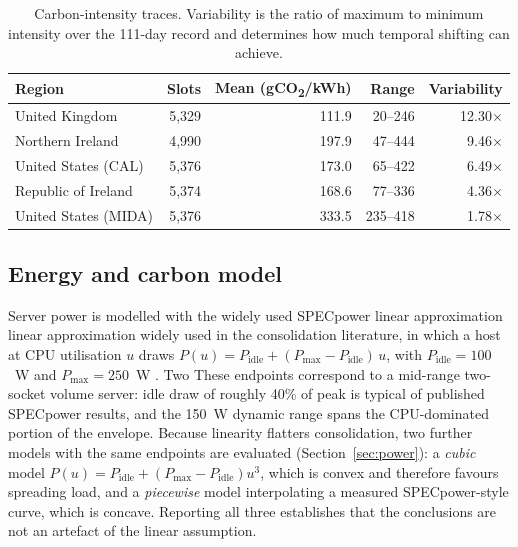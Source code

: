 \documentclass[12pt,a4paper]{article}
\providecommand{\DIFaddtex}[1]{{\protect\color{blue} \sf #1}} %
\providecommand{\DIFdeltex}[1]{{\protect\color{red} \scriptsize #1}} %
\providecommand{\DIFaddbegin}{} %
\providecommand{\DIFaddend}{} %
\providecommand{\DIFdelbegin}{} %
\providecommand{\DIFdelend}{} %
\providecommand{\DIFadd}[1]{\texorpdfstring{\DIFaddtex{#1}}{#1}} %
\providecommand{\DIFdel}[1]{\texorpdfstring{\DIFdeltex{#1}}{}} %
\providecommand{\DIFscaledelfig}{0.5}
\newlength{\DIFdelgraphicswidth} %
\newlength{\DIFdelgraphicsheight} %
\providecommand{\DIFaddincludegraphics}[2][]{{\color{blue}\fbox{\DIFOincludegraphics[#1]{#2}}}} %
\providecommand{\DIFdelincludegraphics}[2][]{%
\sbox{\DIFdelgraphicsbox}{\DIFOincludegraphics[#1]{#2}}%
\settoboxwidth{\DIFdelgraphicswidth}{\DIFdelgraphicsbox} %
\settoboxtotalheight{\DIFdelgraphicsheight}{\DIFdelgraphicsbox} %
\scalebox{\DIFscaledelfig}{%
\parbox[b]{\DIFdelgraphicswidth}{\usebox{\DIFdelgraphicsbox}\\[-\baselineskip] \rule{\DIFdelgraphicswidth}{0em}}\llap{\resizebox{\DIFdelgraphicswidth}{\DIFdelgraphicsheight}{%
\setlength{\unitlength}{\DIFdelgraphicswidth}%
\begin{picture}(1,1)%
\thicklines\linethickness{2pt} %
{\color[rgb]{1,0,0}\put(0,0){\framebox(1,1){}}}%
{\color[rgb]{1,0,0}\put(0,0){\line( 1,1){1}}}%
{\color[rgb]{1,0,0}\put(0,1){\line(1,-1){1}}}%
\end{picture}%
}\hspace*{3pt}}} %
} %
\DeclareRobustCommand{\DIFaddbegin}{\DIFOaddbegin \let\includegraphics\DIFaddincludegraphics} %
\DeclareRobustCommand{\DIFaddend}{\DIFOaddend \let\includegraphics\DIFOincludegraphics} %
\DeclareRobustCommand{\DIFdelbegin}{\DIFOdelbegin \let\includegraphics\DIFdelincludegraphics} %
\DeclareRobustCommand{\DIFdelend}{\DIFOaddend \let\includegraphics\DIFOincludegraphics} %
\begin{document}
\DIFaddbegin \begin{table}[H]\centering\small
\caption{Carbon-intensity traces. Variability is the ratio of maximum to minimum intensity over the
111-day record and determines how much temporal shifting can achieve.}\label{tab:regions}
\begin{tabular}{lrrrr}
\toprule
Region & Slots & Mean (gCO\textsubscript{2}/kWh) & Range & Variability \\
\midrule
United Kingdom       & 5{,}329 & 111.9 & 20--246  & 12.30$\times$ \\
Northern Ireland     & 4{,}990 & 197.9 & 47--444  & 9.46$\times$ \\
United States (CAL)  & 5{,}376 & 173.0 & 65--422  & 6.49$\times$ \\
Republic of Ireland  & 5{,}374 & 168.6 & 77--336  & 4.36$\times$ \\
United States (MIDA) & 5{,}376 & 333.5 & 235--418 & 1.78$\times$ \\
\bottomrule
\end{tabular}
\end{table}

\DIFaddend \subsection{Energy and carbon model}
Server power is modelled with the \DIFdelbegin \DIFdel{widely used SPECpower linear approximation }\DIFdelend \DIFaddbegin \DIFadd{linear approximation widely used in the consolidation literature}\DIFaddend , in which
a host at CPU utilisation $u$ draws $P(u)=P_{\text{idle}}+(P_{\text{max}}-P_{\text{idle}})\,u$, with
$P_{\text{idle}}=100$~W and $P_{\text{max}}=250$~W \cite{beloglazov2012energy}. \DIFdelbegin \DIFdel{Two }\DIFdelend \DIFaddbegin \DIFadd{These endpoints correspond to
a mid-range two-socket volume server: idle draw of roughly 40\% of peak is typical of published SPECpower
results, and the 150~W dynamic range spans the CPU-dominated portion of the envelope. Because linearity
flatters consolidation, two further models with the same endpoints are evaluated
(Section~\ref{sec:power}): a \emph{cubic} model $P(u)=P_{\text{idle}}+(P_{\text{max}}-P_{\text{idle}})u^{3}$,
which is convex and therefore favours spreading load, and a \emph{piecewise} model interpolating a measured
SPECpower-style curve, which is concave. Reporting all three establishes that the conclusions are not an
artefact of the linear assumption.
}
\end{document}
